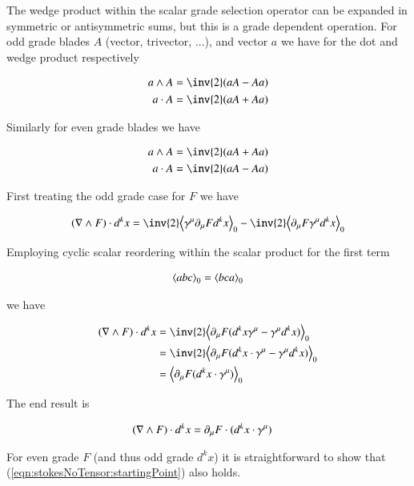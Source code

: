 The wedge product within the scalar grade selection operator can be expanded in symmetric or antisymmetric sums, but this is a grade dependent operation.  For odd grade blades $A$ (vector, trivector, ...), and vector $a$ we have for the dot and wedge product respectively

\begin{align*}
a \wedge A = \inv{2} (a A - A a) \\
a \cdot A = \inv{2} (a A + A a)
\end{align*}

Similarly for even grade blades we have

\begin{align*}
a \wedge A = \inv{2} (a A + A a) \\
a \cdot A = \inv{2} (a A - A a)
\end{align*}

First treating the odd grade case for $F$ we have

\begin{align*}
( \grad \wedge F ) \cdot d^k x
&=
\inv{2} \gpgradezero{ \gamma^\mu \partial_\mu F d^k x } - \inv{2} \gpgradezero{ \partial_\mu F \gamma^\mu d^k x } \\
\end{align*}

Employing cyclic scalar reordering within the scalar product for the first term

\begin{align}
{\left\langle{{a b c}}\right\rangle}_{0} = {\left\langle{{b c a}}\right\rangle}_{0}
\end{align}

we have

\begin{align*}
( \grad \wedge F ) \cdot d^k x
&=
\inv{2} \gpgradezero{ \partial_\mu F (d^k x \gamma^\mu - \gamma^\mu d^k x)} \\
&=
\inv{2} \gpgradezero{ \partial_\mu F (d^k x \cdot \gamma^\mu - \gamma^\mu d^k x)} \\
&=
\gpgradezero{ \partial_\mu F (d^k x \cdot \gamma^\mu)} \\
\end{align*}

The end result is 

\begin{align}\label{eqn:stokesNoTensor:startingPoint}
( \nabla \wedge F ) \cdot d^k x &= \partial_\mu F \cdot (d^k x \cdot \gamma^\mu) 
\end{align}

For even grade $F$ (and thus odd grade $d^k x$) it is straightforward to show that (\ref{eqn:stokesNoTensor:startingPoint}) also holds.

